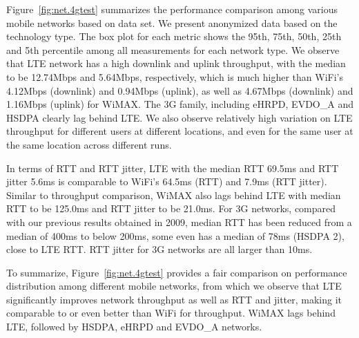 Figure~\ref{fig:net.4gtest} summarizes the performance comparison among various mobile networks based on \FT data set. We present anonymized data based on the technology type. The box plot for each metric shows the 95th, 75th, 50th, 25th and 5th percentile among all measurements for each network type. We observe that LTE network has a high downlink and uplink throughput, with the median to be 12.74Mbps and 5.64Mbps, respectively, which is much higher than WiFi's 4.12Mbps (downlink) and 0.94Mbps (uplink), as well as 4.67Mbps (downlink) and 1.16Mbps (uplink) for WiMAX. The 3G family, including eHRPD, EVDO\_A and HSDPA clearly lag behind LTE. We also observe relatively high variation on LTE throughput for different users at different locations, and even for the same user at the same location across different runs. 


In terms of RTT and RTT jitter, LTE with the median RTT 69.5ms and RTT jitter 5.6ms is comparable to WiFi's 64.5ms (RTT) and 7.9ms (RTT jitter). Similar to throughput comparison, WiMAX also lags behind LTE with median RTT to be 125.0ms and RTT jitter to be 21.0ms. For 3G networks, compared with our previous results obtained in 2009, median RTT has been reduced from a median of 400ms to below 200ms, some even has a median of 78ms (HSDPA 2), close to LTE RTT. RTT jitter for 3G networks are all larger than 10ms.


To summarize, Figure~\ref{fig:net.4gtest} provides a fair comparison on performance distribution among different mobile networks, from which we observe that LTE significantly improves network throughput as well as RTT and jitter, making it comparable to or even better than WiFi for throughput. WiMAX lags behind LTE, followed by HSDPA, eHRPD and EVDO\_A networks.


